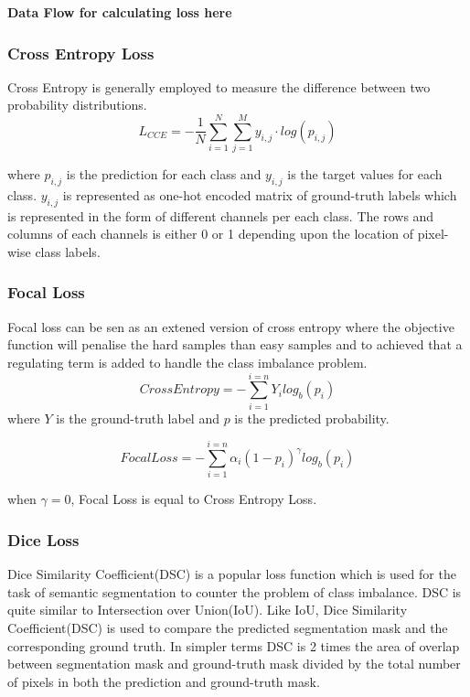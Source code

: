         \textbf{Data Flow for calculating loss here}
        
        \subsubsection{Cross Entropy Loss}
        Cross Entropy is generally employed to measure the difference between two probability distributions.
        \begin{equation}
        L_{CCE} = -\frac{1}{N}\sum_{i=1}^{N} \sum^{M}_{j=1}y_{i,j}\cdot log(p_{i,j})
        \end{equation}
        
        where $p_{i,j}$ is the prediction for each class and $y_{i,j}$ is the target values for each class. $y_{i,j}$ is represented as one-hot encoded matrix of ground-truth labels which is represented in the form of different channels per each class. The rows and columns of each channels is either 0 or 1 depending upon the location of pixel-wise class labels. 
       
        \subsubsection{Focal Loss}
        Focal loss can be sen as an extened version of cross entropy where the objective function will penalise the hard samples than easy samples and to achieved that a regulating term is added to handle the class imbalance problem.
        \begin{equation}
            Cross Entropy = - \sum^{i=n}_{i=1}Y_{i}log_{b}(p_{i})
        \end{equation}
        where $Y$ is the ground-truth label and $p$ is the predicted probability.
        
        \begin{equation}
            Focal Loss = - \sum^{i=n}_{i=1} \alpha_{i}(1-p_{i})^{\gamma} log_{b}(p_{i})
        \end{equation}
        
         when $\gamma = 0$, Focal Loss is equal to Cross Entropy Loss. 
        
        \subsubsection{Dice Loss}
        Dice Similarity Coefficient(DSC) is a popular loss function which is used for the task of semantic segmentation to counter the problem of class imbalance. DSC is quite similar to Intersection over Union(IoU). Like IoU, Dice Similarity Coefficient(DSC) is used to compare the predicted segmentation mask and the corresponding ground truth. In simpler terms DSC is 2 times the area of overlap  between segmentation mask and ground-truth mask divided by the total number of pixels in both the prediction and ground-truth mask.
        
